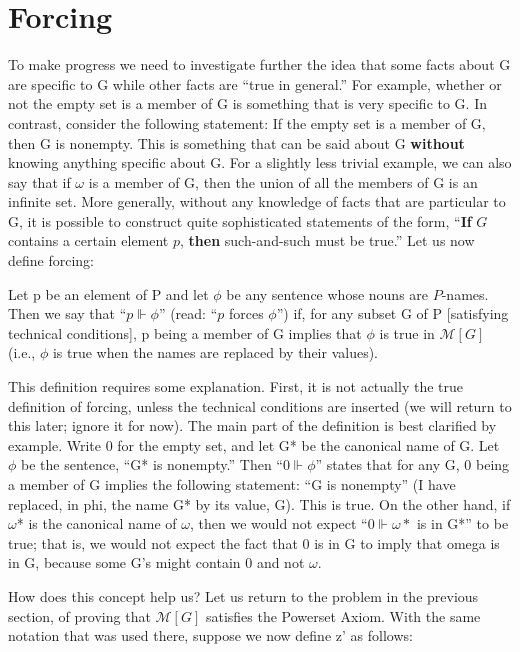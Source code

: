 \documentclass[10pt]{article}
\begin{document}
\section{Forcing}

To make progress we need to investigate further the idea that some facts about G are specific to G while other facts are ``true in general.'' For example, whether or not the empty set is a member of G is something that is very specific to G. In contrast, consider the following statement: If the empty set is a member of G, then G is nonempty. This is something that can be said about G \textbf{without} knowing anything specific about G. For a slightly less trivial example, we can also say that if $\omega$ is a member of G, then the union of all the members of G is an infinite set. More generally, without any knowledge of facts that are particular to G, it is possible to construct quite sophisticated statements of the form, ``\textbf{If} $G$ contains a certain element $p$, \textbf{then} such-and-such must be true.'' Let us now define forcing:

 Let p be an element of P and let $\phi$ be any sentence
 whose nouns are $P$-names. Then we say that ``$p \Vdash \phi$''
 (read: ``$p$ forces $\phi$'') if, for any subset G of P
 [satisfying technical conditions], p being a member
 of G implies that $\phi$ is true in $\mathcal{M}[G]$ (i.e., $\phi$ is
 true when the names are replaced by their values).

This definition requires some explanation. First, it is not actually the true definition of forcing, unless the technical conditions are inserted (we will return to this later; ignore it for now). The main part of the definition is best clarified by example. Write 0 for the empty set, and let G* be the canonical name of G. Let $\phi$ be the sentence, ``G* is nonempty.'' Then ``$0 \Vdash \phi$'' states that for any G, 0 being a member of G implies the following statement: ``G is nonempty'' (I have replaced, in phi, the name G* by its value, G). This is true. On the other hand, if $\omega$* is the canonical name of $\omega$, then we would not expect ``$0 \Vdash \omega*$ is in G*'' to be true; that is, we would not expect the fact that 0 is in G to imply that omega is in G, because some G's might contain 0 and not $\omega$.

How does this concept help us? Let us return to the problem in the previous section, of proving that $\mathcal{M}[G]$ satisfies the Powerset Axiom. With the same notation that was used there, suppose we now define z' as follows:
\end{document}
